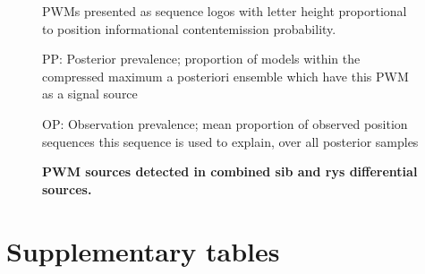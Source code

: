 \documentclass{ut-thesis}
\begin{document}
\begin{NoHyper}
\begin{figure}[!h]
    \caption{{\bf PWM sources detected in combined sib and rys differential sources.}}
    PWMs presented as sequence logos with letter height proportional to position informational content\/emission probability.

    PP: Posterior prevalence; proportion of models within the compressed maximum a posteriori ensemble which have this PWM as a signal source

    OP: Observation prevalence; mean proportion of observed position sequences this sequence is used to explain, over all posterior samples
    \label{combinedmotifs}
\end{figure}

\FloatBarrier

\section{Supplementary tables}


\end{NoHyper}
\end{document}
